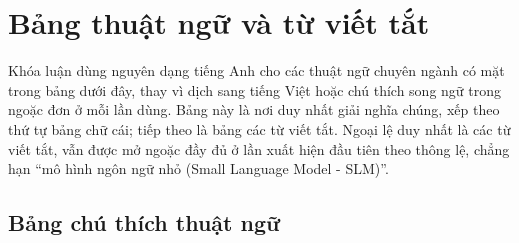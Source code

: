 \chapter*{Bảng thuật ngữ và từ viết tắt}

Khóa luận dùng nguyên dạng tiếng Anh cho các thuật ngữ chuyên ngành có mặt
trong bảng dưới đây, thay vì dịch sang tiếng Việt hoặc chú thích song ngữ
trong ngoặc đơn ở mỗi lần dùng. Bảng này là nơi duy nhất giải nghĩa chúng,
xếp theo thứ tự bảng chữ cái; tiếp theo là bảng các từ viết tắt. Ngoại lệ duy
nhất là các từ viết tắt, vẫn được mở ngoặc đầy đủ ở lần xuất hiện đầu tiên
theo thông lệ, chẳng hạn ``mô hình ngôn ngữ nhỏ (Small Language Model - SLM)''.

\section*{Bảng chú thích thuật ngữ}


